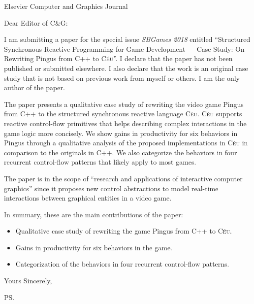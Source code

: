 \documentclass{letter}
\date{April 27, 2018}
\newcommand{\CEU}{\textsc{C\'{e}u}\xspace}
\begin{document}
\begin{letter}{Elsevier Computer and Graphics Journal}

\opening{Dear Editor of C\&G:}

I am submitting a paper for the special issue \emph{SBGames 2018} entitled
``Structured Synchronous Reactive Programming for Game Development ---
Case Study: On Rewriting Pingus from C++ to \CEU''.
I declare that the paper has not been published or submitted elsewhere.
I also declare that the work is an original case study that is not based on
previous work from myself or others.
I am the only author of the paper.

The paper presents a qualitative case study of rewriting the video game Pingus
from C++ to the structured synchronous reactive language \CEU.
%
\CEU supports reactive control-flow primitives that helps describing complex
interactions in the game logic more concisely.
%
We show gains in productivity for six behaviors in Pingus through a qualitative
analysis of the proposed implementations in \CEU in comparison to the originals
in C++.
%
We also categorize the behaviors in four recurrent control-flow patterns that
likely apply to most games.

The paper is in the scope of ``research and applications of interactive
computer graphics'' since it proposes new control abstractions to model
real-time interactions between graphical entities in a video game.

In summary, these are the main contributions of the paper:
%
\begin{itemize}
\item Qualitative case study of rewriting the game Pingus from C++ to \CEU.
\item Gains in productivity for six behaviors in the game.
\item Categorization of the behaviors in four recurrent control-flow patterns.
\end{itemize}

\closing{Yours Sincerely,}

\ps

\end{letter}
\end{document}
